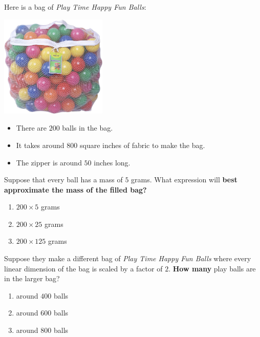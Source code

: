 \documentclass[handout,noauthor,nooutcomes,12pt]{ximera}
\author{Bart Snapp}
\begin{document}
\maketitle


Here is a bag of \textit{Play Time Happy Fun Balls}:
\begin{multicols}{2}
  \begin{center}
    \includegraphics[width=2in]{ballsInBag.jpg}
  \end{center}
  \begin{itemize}
  \item There are $200$ balls in the bag.
  \item It takes around $800$ square inches of fabric to make the bag.
  \item The zipper is around $50$ inches long.
  \end{itemize}
\end{multicols}






\begin{exercise}
  Suppose that every ball has a mass of $5$ grams.  What expression
  will \textbf{best approximate the mass of the filled bag?}
  \begin{multicols}{3}
    \begin{enumerate}
  \item $200\times5$ grams
  \item $200\times25$ grams
  \item $200\times125$ grams
    \end{enumerate}
  \end{multicols}
\end{exercise}



\begin{exercise}
  Suppose they make a different bag of \textit{Play Time Happy Fun
    Balls} where every linear dimension of the bag is scaled by a
  factor of $2$.  \textbf{How many} play balls are in the larger bag?
  \begin{multicols}{3}
    \begin{enumerate}
  \item around $400$ balls
  \item around $600$ balls
  \item around $800$ balls
    \end{enumerate}
  \end{multicols}
\end{exercise}
\end{document}
